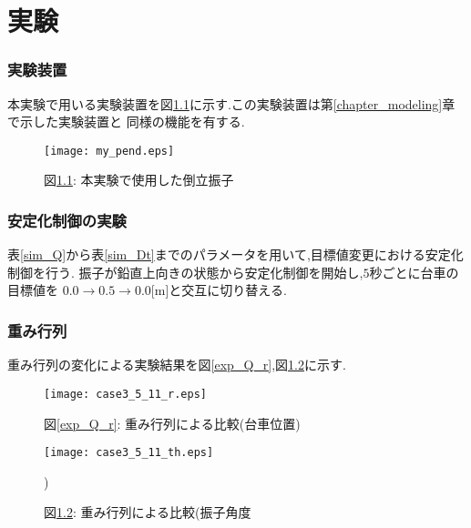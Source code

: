 \chapter{実験}

\subsection{実験装置}
本実験で用いる実験装置を図\ref{my_pend}に示す.この実験装置は第\ref{chapter_modeling}章で示した実験装置と
同様の機能を有する.

\begin{figure}[htbp]
    \begin{center}
        \texttt{[image: my\_pend.eps]}
        \caption{図\ref{my_pend}: 本実験で使用した倒立振子}
        \label{my_pend}
    \end{center}
\end{figure}


\subsection{安定化制御の実験}
表\ref{sim_Q}から表\ref{sim_Dt}までのパラメータを用いて,目標値変更における安定化制御を行う.
振子が鉛直上向きの状態から安定化制御を開始し,$5$秒ごとに台車の目標値を
$0.0 \to 0.5 \to 0.0$[m]と交互に切り替える.

\subsection{重み行列}
重み行列の変化による実験結果を図\ref{exp_Q_r},図\ref{exp_Q_th}に示す.

\begin{figure}[htbp]
    \begin{minipage}{0.5\hsize}
        \begin{center}
            \texttt{[image: case3\_5\_11\_r.eps]}
            \caption{図\ref{exp_Q_r}: 重み行列による比較(台車位置)}
            \label{exp_Q_r}
        \end{center}
    \end{minipage}
    \begin{minipage}{0.5\hsize}
        \begin{center}
            \texttt{[image: case3\_5\_11\_th.eps]}
            \caption{図\ref{exp_Q_th}: 重み行列による比較(振子角度})
            \label{exp_Q_th}
        \end{center}
    \end{minipage}
\end{figure}

